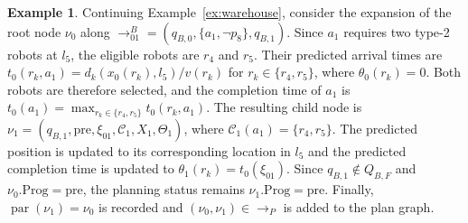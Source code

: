 \documentclass[lettersize,journal]{IEEEtran}
\theoremstyle{italiclemma}
\theoremstyle{italiclemma}
\theoremstyle{definition}
\newtheorem{example}{Example}
\begin{document}
\begin{example}\label{ex:plan_node_extension}
Continuing Example~\ref{ex:warehouse}, consider the expansion of the root node $\nu_0$ along $\rightarrow^B_{01} = (q_{B,0},\{a_1,\neg p_8\},q_{B,1})$. Since $a_1$ requires two type-2 robots at $l_5$, the eligible robots are $r_4$ and $r_5$. Their predicted arrival times are $t_0(r_k,a_1)=d_k(x_0(r_k),l_5)/v(r_k)$ for
$r_k\in\{r_4,r_5\}$, where $\theta_0(r_k)=0$. Both robots are therefore selected, and the completion time of $a_1$ is
$t_0(a_1)=\max_{r_k\in\{r_4,r_5\}}t_0(r_k,a_1)$.  The resulting child node is $\nu_1=(q_{B,1},\mathrm{pre},\xi_{01},\mathcal C_1,X_1,\Theta_1)$, where $\mathcal C_1(a_1)=\{r_4,r_5\}$. The predicted position is updated to its corresponding location in $l_5$ and the predicted completion time is updated to $\theta_1(r_k)=t_0(\xi_{01})$. Since $q_{B,1}\notin Q_{B,F}$ and $\nu_0.\mathrm{Prog}=\mathrm{pre}$, the planning status remains $\nu_1.\mathrm{Prog}=\mathrm{pre}$. Finally, $\operatorname{par}(\nu_1)=\nu_0$ is recorded and $(\nu_0,\nu_1)\in\rightarrow_P$ is added to the plan graph.
\end{example}

\end{document}
